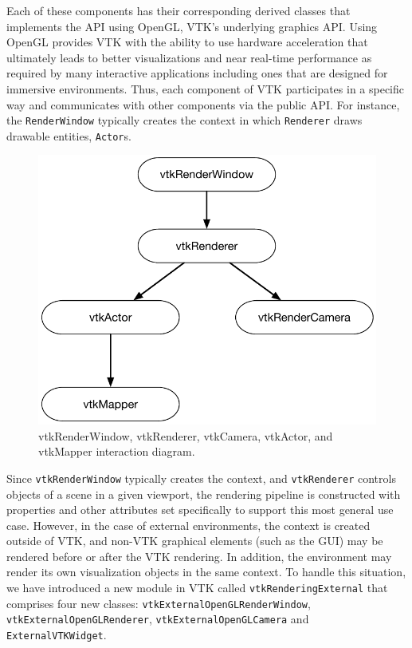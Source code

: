 Each of these components has their corresponding derived classes that implements the API using OpenGL, VTK's underlying graphics API.
Using OpenGL provides VTK with the ability to use hardware acceleration that ultimately leads to better visualizations and near real-time performance as required by many interactive applications including ones that are designed for immersive environments.
Thus, each component of VTK participates in a specific way and communicates with other components via the public API.
For instance, the \texttt{RenderWindow} typically creates the context in which \texttt{Renderer} draws drawable entities, \texttt{Actor}s.

\begin{figure}[h!]
 \centering
  \includegraphics[width=\linewidth]{images/vtkRenderPipeline.pdf}
  \caption{vtkRenderWindow, vtkRenderer, vtkCamera, vtkActor, and vtkMapper interaction diagram.}
\label{fig:vtkRenderPipeline}
\end{figure}

Since \texttt{vtkRenderWindow} typically creates the context, and \texttt{vtkRenderer} controls objects of a scene in a given viewport, the rendering pipeline is constructed with properties and other attributes set specifically to support this most general use case.
However, in the case of external environments, the context is created outside of VTK, and non-VTK graphical elements (such as the GUI) may be rendered before or after the VTK rendering.
In addition, the environment may render its own visualization objects in the same context.
To handle this situation, we have introduced a new module in VTK called \texttt{vtkRenderingExternal} that comprises four new classes: \texttt{vtkExternalOpenGLRenderWindow}, \texttt{vtkExternalOpenGLRenderer}, \texttt{vtkExternalOpenGLCamera} and \texttt{ExternalVTKWidget}.

